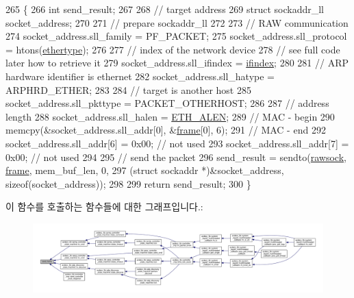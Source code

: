 \begin{DoxyCode}
265 \{
266     \textcolor{keywordtype}{int} send\_result;
267 
268     \textcolor{comment}{// target address}
269     \textcolor{keyword}{struct }sockaddr\_ll socket\_address;
270 
271     \textcolor{comment}{// prepare sockaddr\_ll}
272 
273     \textcolor{comment}{// RAW communication}
274     socket\_address.sll\_family = PF\_PACKET;
275     socket\_address.sll\_protocol = htons(\hyperlink{classavdecc__lib_1_1net__interface__imp_aa9296c58dc24c63c4ee927db394a97d7}{ethertype});
276 
277     \textcolor{comment}{// index of the network device}
278     \textcolor{comment}{// see full code later how to retrieve it}
279     socket\_address.sll\_ifindex = \hyperlink{classavdecc__lib_1_1net__interface__imp_a01e636f8746c84f1cf3d45c4afbfde35}{ifindex};
280 
281     \textcolor{comment}{// ARP hardware identifier is ethernet}
282     socket\_address.sll\_hatype = ARPHRD\_ETHER;
283 
284     \textcolor{comment}{// target is another host}
285     socket\_address.sll\_pkttype = PACKET\_OTHERHOST;
286 
287     \textcolor{comment}{// address length}
288     socket\_address.sll\_halen = \hyperlink{openavb__avdecc__pub_8h_a9822d89774e0d6ddaa06503950130423}{ETH\_ALEN};
289     \textcolor{comment}{// MAC - begin}
290     memcpy(&socket\_address.sll\_addr[0], &\hyperlink{gst__avb__playbin_8c_ac8e710e0b5e994c0545d75d69868c6f0}{frame}[0], 6);
291     \textcolor{comment}{// MAC - end}
292     socket\_address.sll\_addr[6] = 0x00; \textcolor{comment}{// not used}
293     socket\_address.sll\_addr[7] = 0x00; \textcolor{comment}{// not used}
294 
295     \textcolor{comment}{// send the packet}
296     send\_result = sendto(\hyperlink{classavdecc__lib_1_1net__interface__imp_a9a1008a3b40e75b22aa5d7945cbf2918}{rawsock}, \hyperlink{gst__avb__playbin_8c_ac8e710e0b5e994c0545d75d69868c6f0}{frame}, mem\_buf\_len, 0,
297                          (\textcolor{keyword}{struct} sockaddr *)&socket\_address, \textcolor{keyword}{sizeof}(socket\_address));
298 
299     \textcolor{keywordflow}{return} send\_result;
300 \}
\end{DoxyCode}


이 함수를 호출하는 함수들에 대한 그래프입니다.\+:
\nopagebreak
\begin{figure}[H]
\begin{center}
\leavevmode
\includegraphics[width=350pt]{classavdecc__lib_1_1net__interface__imp_ac1a430cb59bcfc3b43ed26b624db5dea_icgraph}
\end{center}
\end{figure}


